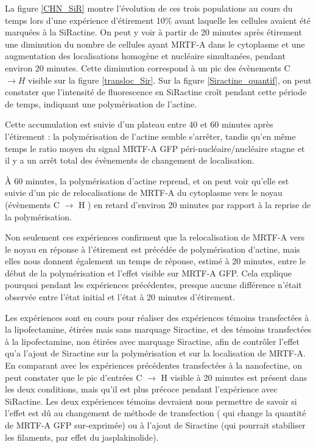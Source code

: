 La figure \ref{CHN_SiR} montre l'évolution de ces trois populations au cours du temps lors d'une expérience d'étirement 10\% avant laquelle les cellules avaient été marquées à la SiRactine. 
On peut y voir à partir de 20 minutes après étirement une diminution du nombre de cellules ayant MRTF-A dans le cytoplasme et une augmentation des localisations homogène et nucléaire simultanées, pendant environ 20 minutes. 
Cette diminution correspond à un pic des évènements C $\rightarrow H$ visible sur la figure \ref{transloc_Sir}. 
Sur la figure \ref{Siractine_quantif}, on peut constater que l'intensité de fluorescence en SiRactine croît pendant cette période de temps, indiquant une polymérisation de l'actine. 

Cette accumulation est suivie d'un plateau entre 40 et 60 minutes après l'étirement : la polymérisation de l'actine semble s'arrêter, tandis qu'en même temps le ratio moyen du signal MRTF-A GFP péri-nucléaire/nucléaire stagne et il y a un arrêt total des évènements de changement de localisation. 

À 60 minutes, la polymérisation d'actine reprend, et on peut voir qu'elle est suivie d'un pic de relocalisations de MRTF-A du cytoplasme vers le noyau (évènements C $\rightarrow$ H ) en retard d'environ 20 minutes par rapport à la reprise de la polymérisation. 

Non seulement ces expériences confirment que la relocalisation de MRTF-A vers le noyau en réponse à l'étirement est précédée de polymérisation d'actine, mais elles nous donnent également un temps de réponse, estimé à 20 minutes, entre le début de la polymérisation et l'effet visible sur MRTF-A GFP. Cela explique pourquoi pendant les expériences précédentes, presque aucune différence n'était observée entre l'état initial et l'état à 20 minutes d'étirement.

Les expériences sont en cours pour réaliser des expériences témoins transfectées à la lipofectamine, étirées mais sans marquage Siractine, et des témoins transfectées à la lipofectamine, non étirées avec marquage Siractine, afin de contrôler l'effet qu'a l'ajout de Siractine sur la polymérisation et sur la localisation de MRTF-A. 
En comparant avec les expériences précédentes transfectées à la nanofectine, on peut constater que le pic d'entrées C $\rightarrow$ H visible à 20 minutes est présent dans les deux conditions, mais qu'il est plus précoce pendant l'expérience avec SiRactine. Les deux expériences témoins devraient nous permettre de savoir si l'effet est dû au changement de méthode de transfection ( qui change la quantité de MRTF-A GFP sur-exprimée) ou à l'ajout de Siractine (qui pourrait stabiliser les filaments, par effet du jasplakinolide). 
 

